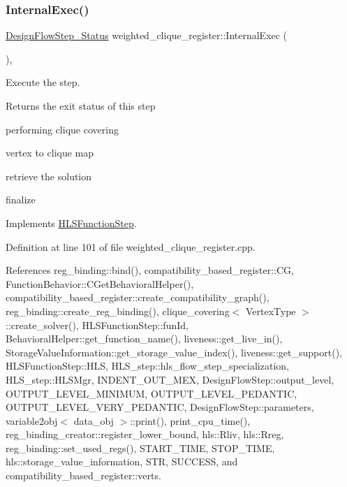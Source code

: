 \subsubsection{\texorpdfstring{Internal\+Exec()}{InternalExec()}}
{\footnotesize\ttfamily \hyperlink{design__flow__step_8hpp_afb1f0d73069c26076b8d31dbc8ebecdf}{Design\+Flow\+Step\+\_\+\+Status} weighted\+\_\+clique\+\_\+register\+::\+Internal\+Exec (\begin{DoxyParamCaption}{ }\end{DoxyParamCaption})\hspace{0.3cm}{\ttfamily [override]}, {\ttfamily [virtual]}}



Execute the step. 

\begin{DoxyReturn}{Returns}
the exit status of this step 
\end{DoxyReturn}
performing clique covering

vertex to clique map

retrieve the solution

finalize 

Implements \hyperlink{classHLSFunctionStep_a8db4c00d080655984d98143206fc9fa8}{H\+L\+S\+Function\+Step}.



Definition at line 101 of file weighted\+\_\+clique\+\_\+register.\+cpp.



References reg\+\_\+binding\+::bind(), compatibility\+\_\+based\+\_\+register\+::\+CG, Function\+Behavior\+::\+C\+Get\+Behavioral\+Helper(), compatibility\+\_\+based\+\_\+register\+::create\+\_\+compatibility\+\_\+graph(), reg\+\_\+binding\+::create\+\_\+reg\+\_\+binding(), clique\+\_\+covering$<$ Vertex\+Type $>$\+::create\+\_\+solver(), H\+L\+S\+Function\+Step\+::fun\+Id, Behavioral\+Helper\+::get\+\_\+function\+\_\+name(), liveness\+::get\+\_\+live\+\_\+in(), Storage\+Value\+Information\+::get\+\_\+storage\+\_\+value\+\_\+index(), liveness\+::get\+\_\+support(), H\+L\+S\+Function\+Step\+::\+H\+LS, H\+L\+S\+\_\+step\+::hls\+\_\+flow\+\_\+step\+\_\+specialization, H\+L\+S\+\_\+step\+::\+H\+L\+S\+Mgr, I\+N\+D\+E\+N\+T\+\_\+\+O\+U\+T\+\_\+\+M\+EX, Design\+Flow\+Step\+::output\+\_\+level, O\+U\+T\+P\+U\+T\+\_\+\+L\+E\+V\+E\+L\+\_\+\+M\+I\+N\+I\+M\+UM, O\+U\+T\+P\+U\+T\+\_\+\+L\+E\+V\+E\+L\+\_\+\+P\+E\+D\+A\+N\+T\+IC, O\+U\+T\+P\+U\+T\+\_\+\+L\+E\+V\+E\+L\+\_\+\+V\+E\+R\+Y\+\_\+\+P\+E\+D\+A\+N\+T\+IC, Design\+Flow\+Step\+::parameters, variable2obj$<$ data\+\_\+obj $>$\+::print(), print\+\_\+cpu\+\_\+time(), reg\+\_\+binding\+\_\+creator\+::register\+\_\+lower\+\_\+bound, hls\+::\+Rliv, hls\+::\+Rreg, reg\+\_\+binding\+::set\+\_\+used\+\_\+regs(), S\+T\+A\+R\+T\+\_\+\+T\+I\+ME, S\+T\+O\+P\+\_\+\+T\+I\+ME, hls\+::storage\+\_\+value\+\_\+information, S\+TR, S\+U\+C\+C\+E\+SS, and compatibility\+\_\+based\+\_\+register\+::verts.

